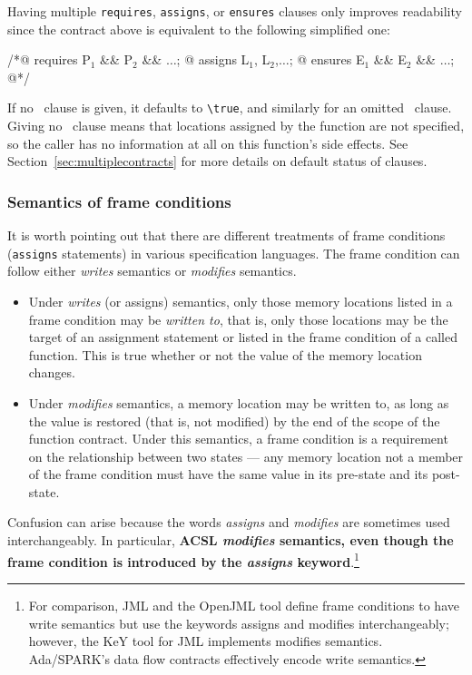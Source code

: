 Having multiple \lstinline|requires|, \lstinline|assigns|, or
\lstinline|ensures| clauses only improves
readability since the contract above is equivalent to the following
simplified one:
\begin{listing}{1}
/*@ requires P$_1$ && P$_2$ && $\dots$;
  @ assigns L$_1$, L$_2$,$\dots$;
  @ ensures E$_1$ && E$_2$ && $\dots$;
  @*/
\end{listing}
If no \requires\ clause is given, it defaults to
\lstinline!\true!, and similarly for an omitted \ensures\ clause.
Giving no \assigns\ clause
means that locations assigned by the function are not specified, so
the caller has no information at all on this function's side
effects. See Section~\ref{sec:multiplecontracts} for more details on
default status of clauses.

\subsubsection{Semantics of frame conditions}
\label{sec:writesSemantics}
It is worth pointing out that there are different treatments of
frame conditions (\lstinline|assigns| statements) in various specification languages.
The frame condition can follow either \emph{writes} semantics or \emph{modifies} semantics.
\begin{itemize}
	\item Under \emph{writes} (or assigns) semantics, only those memory locations listed in a frame condition may be \emph{written to}, that is, only those locations may be the target of an assignment statement or listed in the frame condition of a called function. This is true whether or not the value of the memory location changes.
	\item Under \emph{modifies} semantics, a memory location may be written to, as long as the value is restored (that is, not modified) by the end of the scope of the function contract. Under this semantics, a frame condition is a requirement on the relationship between two states --- any memory location not a member of the frame condition must have the same value in its pre-state and its post-state.
\end{itemize}
Confusion can arise because the words \emph{assigns} and \emph{modifies} are sometimes used interchangeably. In particular, \textbf{ACSL  \iftoggle{isCPP}{use}{uses}
	\emph{modifies} semantics, even though the frame condition is introduced by the \emph{assigns} keyword}.\footnote{For comparison, JML and the OpenJML tool define frame conditions to have write semantics but use the keywords assigns and modifies interchangeably; however, the KeY tool for JML implements modifies semantics. Ada/SPARK's data flow contracts effectively encode write semantics.}

